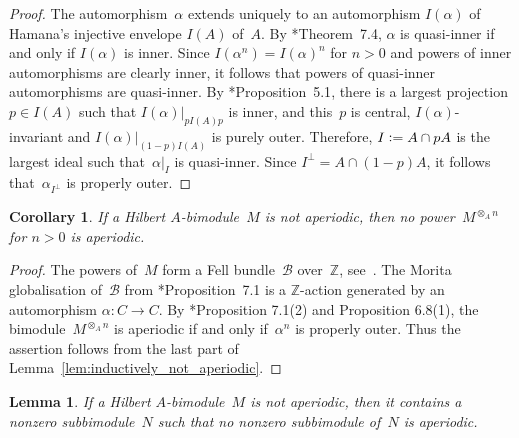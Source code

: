 \documentclass[a4paper]{amsart}
\theoremstyle{plain}
\newtheorem{lemma}[theorem]{Lemma}
\newtheorem{corollary}[theorem]{Corollary}
\theoremstyle{definition}
\theoremstyle{remark}
\numberwithin{theorem}{section}
\numberwithin{equation}{section}
\newcommand*{\nb}{\nobreakdash}
\newcommand*{\Z}{\mathbb Z}
\newcommand*{\B}{\mathcal B}%
\newcommand*{\defeq}{\mathrel{\vcentcolon=}}%
\begin{document}
\begin{proof}
  The automorphism~\(\alpha\) extends uniquely to an automorphism
  \(I(\alpha)\) of Hamana's injective envelope \(I(A)\) of~\(A\).
  By \cite{Hamana:injective-C-dyn}*{Theorem~7.4}, \(\alpha\) is
  quasi-inner if and only if \(I(\alpha)\) is inner.
  Since \(I(\alpha^n)=I(\alpha)^n\) for \(n>0\) and powers of inner
  automorphisms are clearly inner, it follows that powers of
  quasi-inner automorphisms are quasi-inner.
  By \cite{Hamana:tensorI}*{Proposition~5.1}, there is a largest
  projection \(p\in I(A)\) such that  \(I(\alpha)|_{pI(A)p}\) is
  inner, and this~\(p\) is central, \(I(\alpha)\)-invariant and
  \(I(\alpha)|_{(1-p)I(A)}\) is purely outer.
  Therefore, \(I\defeq A\cap pA\) is the largest ideal such
  that~\(\alpha|_I\) is quasi-inner.
  Since \(I^\bot=A\cap (1-p)A\), it follows that~\(\alpha_{I^\bot}\)
  is properly outer.
\end{proof}

\begin{corollary}
  \label{cor:inductive_not_aperiodic}
  If a Hilbert \(A\)\nb-bimodule~\(M\) is not aperiodic, then no
  power~\(M^{\otimes_A n}\) for \(n>0\) is aperiodic.
\end{corollary}

\begin{proof}
  The powers of~\(M\) form a Fell bundle~\(\B\) over~\(\Z\),
  see~\cite{Abadie-Eilers-Exel:Morita_bimodules}.
  The Morita globalisation of~\(\mathcal{B}\) from
  \cite{Kwasniewski-Meyer:Aperiodicity}*{Proposition~7.1} is a
  \(\Z\)\nb-action generated by an automorphism \(\alpha\colon C\to
  C\).
  By  \cite{Kwasniewski-Meyer:Aperiodicity}*{Proposition 7.1(2) and
    Proposition 6.8(1)},
  the bimodule~\(M^{\otimes_A n}\) is aperiodic if and only
  if~\(\alpha^n\) is properly outer.
  Thus the assertion follows from the last part of
  Lemma~\ref{lem:inductively_not_aperiodic}.
\end{proof}

\begin{lemma}
  \label{lem:hereditarily_aperiodic}
  If a Hilbert \(A\)\nb-bimodule~\(M\) is not aperiodic, then it
  contains a nonzero subbimodule~\(N\) such that no nonzero
  subbimodule of~\(N\) is aperiodic.
\end{lemma}
\end{document}
